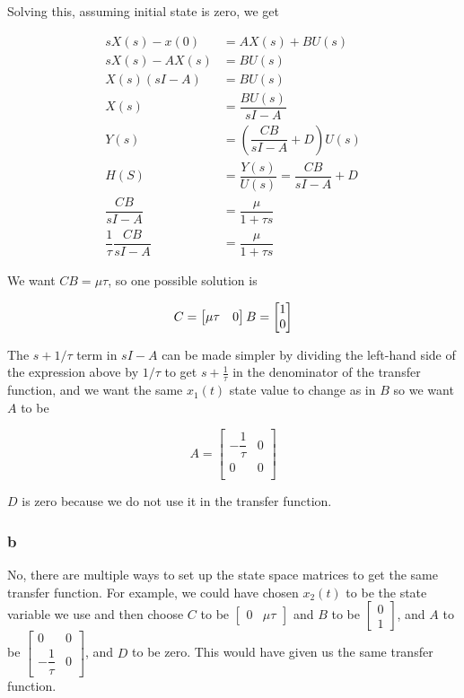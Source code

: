 \documentclass[11pt]{article}
\begin{document}
Solving this, assuming initial state is zero, we get

\begin{align*}
    sX(s) - x(0) &= AX(s) + BU(s) \\
    sX(s) - AX(s) &= BU(s) \\
    X(s) (sI - A) &= BU(s) \\
    X(s) &= \dfrac{BU(s)}{sI - A} \\
    Y(s) &= \left( \dfrac{CB}{sI - A} + D \right) U(s) \\
    H(S) &= \dfrac{Y(s)}{U(s)} = \dfrac{CB}{sI - A} + D \\
    \dfrac{CB}{sI - A} &= \dfrac{\mu}{1 + \tau s} \\
    \dfrac{1}{\tau} \dfrac{CB}{sI - A} &= \dfrac{\mu}{1 + \tau s}
\end{align*}

We want $CB = \mu \tau$, so one possible solution is

\[
    C = \begin{bmatrix} \mu \tau & 0 \end{bmatrix} \\
    B = \begin{bmatrix} 1 \\ 0 \end{bmatrix}
\]

The $s + 1 / \tau$ term in $sI - A$ can be made simpler by dividing the left-hand side of the expression above by $1 / \tau$ to get $s + \frac{1}{\tau}$ in the denominator of the transfer function, and we want the same $x_1(t)$ state value to change as in $B$ so we want $A$ to be

\[
    A = \begin{bmatrix}
        -\dfrac{1}{\tau} & 0 \\
        0 & 0 \\ 
    \end{bmatrix}
\]

$D$ is zero because we do not use it in the transfer function.

\subsubsection{b}

No, there are multiple ways to set up the state space matrices to get the same transfer function. For example, we could have chosen $x_2(t)$ to be the state variable we use and then choose $C$ to be $\begin{bmatrix} 0 & \mu \tau \end{bmatrix}$ and $B$ to be $\begin{bmatrix} 0 \\ 1 \end{bmatrix}$, and $A$ to be $\begin{bmatrix} 0 & 0 \\ -\dfrac{1}{\tau} & 0 \end{bmatrix}$, and $D$ to be zero. This would have given us the same transfer function.
\end{document}
